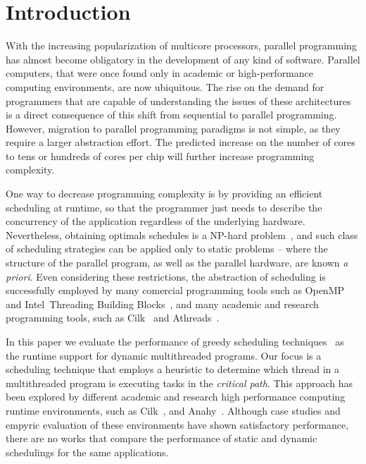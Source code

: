 \documentclass[twocolumn]{svjour3}
\begin{document}
\section{Introduction}

With the increasing popularization of multicore processors, parallel programming has almost become obligatory in the development of any kind of software. Parallel computers, that were once found only in academic or high-performance computing environments, are now ubiquitous. The rise on the demand for programmers that are capable of understanding the issues of these architectures is a direct consequence of this shift from sequential to parallel programming. However, migration to parallel programming paradigms is not simple, as they require a larger abstraction effort. The predicted increase on the number of cores to tens or hundreds of cores per chip will further increase programming complexity.

One way to decrease programming complexity is by providing an efficient scheduling at runtime, so that the programmer just needs to describe the concurrency of the application regardless of the underlying hardware. Nevertheless, obtaining optimals schedules is a NP-hard problem~\cite{casavant88}, and such class of scheduling strategies can be applied only to static problems -- where the structure of the parallel program, as well as the parallel hardware, are known {\em a priori}. Even considering these restrictions, the abstraction of scheduling is successfully employed by many comercial programming tools such as OpenMP~\cite{ChandraOpenMP} and Intel\textregistered~Threading Building Blocks~\cite{TBB2007}, and many academic and research programming tools, such as Cilk~\cite{Cilk95} and Athreads~\cite{VecParLNCS}.

In this paper we evaluate the performance of greedy scheduling techniques~\cite{ListScheduling1989,ListScheduling1990} as the runtime support for dynamic multithreaded programs. Our focus is a scheduling technique that employs a heuristic to determine which thread in a multithreaded program is executing tasks in the \emph{critical path}. This approach has been explored by different academic and research high performance computing runtime environments, such as Cilk~\cite{Cilk95}, and Anahy~\cite{VecParLNCS}. Although case studies and empyric evaluation of these environments have shown satisfactory performance, there are no works that compare the performance of static and dynamic schedulings for the same applications. 
\end{document}
